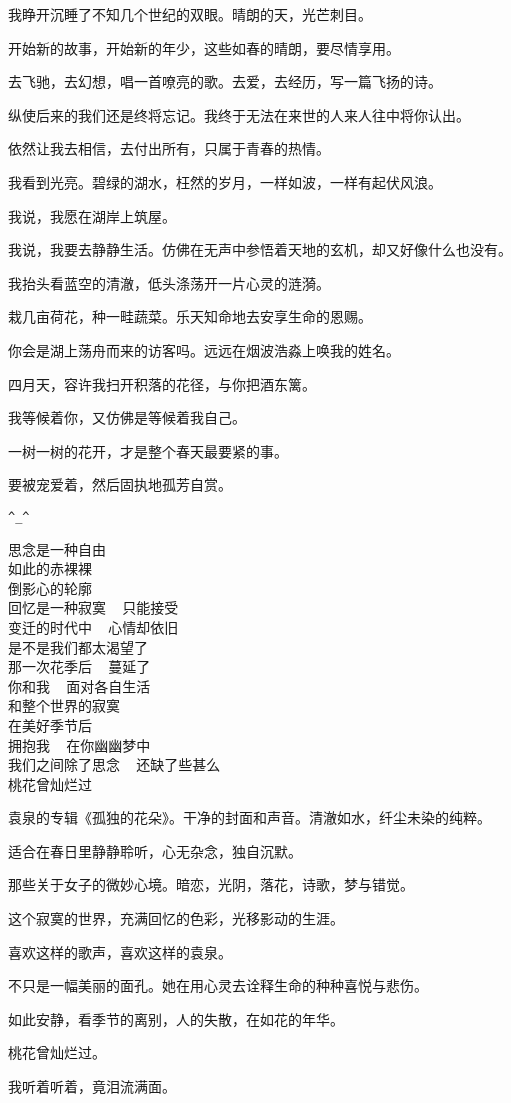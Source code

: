 		我睁开沉睡了不知几个世纪的双眼。晴朗的天，光芒刺目。\par
		开始新的故事，开始新的年少，这些如春的晴朗，要尽情享用。\par
		去飞驰，去幻想，唱一首嘹亮的歌。去爱，去经历，写一篇飞扬的诗。\par
		纵使后来的我们还是终将忘记。我终于无法在来世的人来人往中将你认出。\par
		依然让我去相信，去付出所有，只属于青春的热情。\par
		我看到光亮。碧绿的湖水，枉然的岁月，一样如波，一样有起伏风浪。\par
		我说，我愿在湖岸上筑屋。\par
		我说，我要去静静生活。仿佛在无声中参悟着天地的玄机，却又好像什么也没有。\par
		我抬头看蓝空的清澈，低头涤荡开一片心灵的涟漪。\par
		栽几亩荷花，种一畦蔬菜。乐天知命地去安享生命的恩赐。\par
		你会是湖上荡舟而来的访客吗。远远在烟波浩淼上唤我的姓名。\par
		四月天，容许我扫开积落的花径，与你把酒东篱。\par
		我等候着你，又仿佛是等候着我自己。\par
		一树一树的花开，才是整个春天最要紧的事。\par
		要被宠爱着，然后固执地孤芳自赏。

		\verb|^_^|

	\endwriting



		\longpoem{}{}{}
			思念是一种自由 \\
			如此的赤裸裸 \\
			倒影心的轮廓 \\
			回忆是一种寂寞 ~ 只能接受 \\
			变迁的时代中 ~ 心情却依旧 \\
			是不是我们都太渴望了 \\
			那一次花季后 ~ 蔓延了 \\
			你和我 ~ 面对各自生活 \\
			和整个世界的寂寞 \\
			在美好季节后 \\
			拥抱我 ~ 在你幽幽梦中 \\
			我们之间除了思念 ~ 还缺了些甚么 \\
			桃花曾灿烂过
		\endlongpoem

		袁泉的专辑《孤独的花朵》。干净的封面和声音。清澈如水，纤尘未染的纯粹。\par
		适合在春日里静静聆听，心无杂念，独自沉默。\par
		那些关于女子的微妙心境。暗恋，光阴，落花，诗歌，梦与错觉。\par
		这个寂寞的世界，充满回忆的色彩，光移影动的生涯。\par
		喜欢这样的歌声，喜欢这样的袁泉。\par
		不只是一幅美丽的面孔。她在用心灵去诠释生命的种种喜悦与悲伤。\par
		如此安静，看季节的离别，人的失散，在如花的年华。\par
		桃花曾灿烂过。\par
		我听着听着，竟泪流满面。

